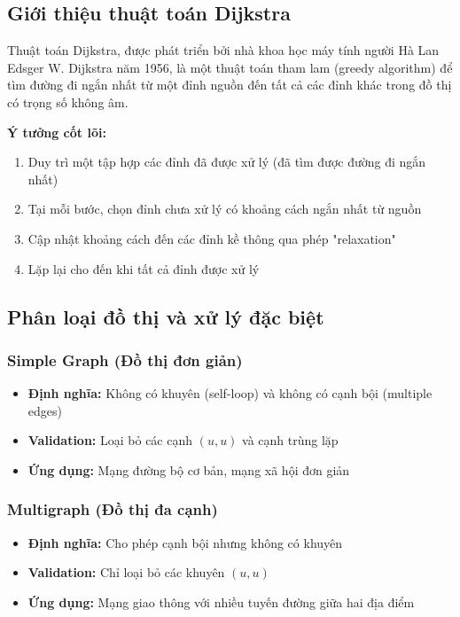 \documentclass[12pt]{article}
\begin{document}
\subsection*{Giới thiệu thuật toán Dijkstra}

Thuật toán Dijkstra, được phát triển bởi nhà khoa học máy tính người Hà Lan Edsger W. Dijkstra năm 1956, là một thuật toán tham lam (greedy algorithm) để tìm đường đi ngắn nhất từ một đỉnh nguồn đến tất cả các đỉnh khác trong đồ thị có trọng số không âm.

\textbf{Ý tưởng cốt lõi:}
\begin{enumerate}
    \item Duy trì một tập hợp các đỉnh đã được xử lý (đã tìm được đường đi ngắn nhất)
    \item Tại mỗi bước, chọn đỉnh chưa xử lý có khoảng cách ngắn nhất từ nguồn
    \item Cập nhật khoảng cách đến các đỉnh kề thông qua phép "relaxation"
    \item Lặp lại cho đến khi tất cả đỉnh được xử lý
\end{enumerate}

\subsection*{Phân loại đồ thị và xử lý đặc biệt}

\subsubsection*{Simple Graph (Đồ thị đơn giản)}
\begin{itemize}
    \item \textbf{Định nghĩa:} Không có khuyên (self-loop) và không có cạnh bội (multiple edges)
    \item \textbf{Validation:} Loại bỏ các cạnh $(u,u)$ và cạnh trùng lặp
    \item \textbf{Ứng dụng:} Mạng đường bộ cơ bản, mạng xã hội đơn giản
\end{itemize}

\subsubsection*{Multigraph (Đồ thị đa cạnh)}
\begin{itemize}
    \item \textbf{Định nghĩa:} Cho phép cạnh bội nhưng không có khuyên
    \item \textbf{Validation:} Chỉ loại bỏ các khuyên $(u,u)$
    \item \textbf{Ứng dụng:} Mạng giao thông với nhiều tuyến đường giữa hai địa điểm
\end{itemize}
\end{document}
